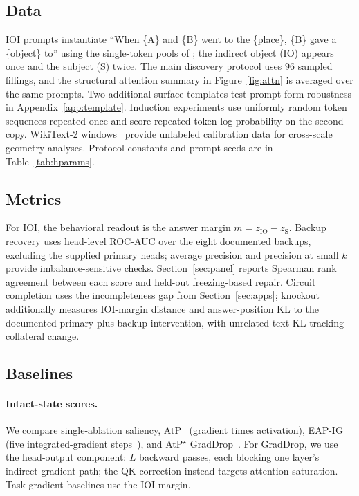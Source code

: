 \subsection{Data}
\label{app:data}

IOI prompts instantiate ``When \{A\} and \{B\} went to the \{place\}, \{B\} gave a \{object\} to'' using the single-token pools of \citet{wang2022ioi}; the indirect object (IO) appears once and the subject (S) twice.
The main discovery protocol uses $96$ sampled fillings, and the structural attention summary in Figure~\ref{fig:attn} is averaged over the same prompts.
Two additional surface templates test prompt-form robustness in Appendix~\ref{app:template}.
Induction experiments use uniformly random token sequences repeated once and score repeated-token log-probability on the second copy.
WikiText-2 windows~\citep{merity2017wikitext} provide unlabeled calibration data for cross-scale geometry analyses.
Protocol constants and prompt seeds are in Table~\ref{tab:hparams}.

\subsection{Metrics}
\label{app:metrics}

For IOI, the behavioral readout is the answer margin $m=z_{\mathrm{IO}}-z_{\mathrm{S}}$.
Backup recovery uses head-level ROC-AUC over the eight documented backups, excluding the supplied primary heads; average precision and precision at small $k$ provide imbalance-sensitive checks.
Section~\ref{sec:panel} reports Spearman rank agreement between each score and held-out freezing-based repair.
Circuit completion uses the incompleteness gap from Section~\ref{sec:apps}; knockout additionally measures IOI-margin distance and answer-position KL to the documented primary-plus-backup intervention, with unrelated-text KL tracking collateral change.

\subsection{Baselines}
\label{app:baselines}

\paragraph{Intact-state scores.}
We compare single-ablation saliency, AtP~\citep{syed2023attribution} (gradient times activation), EAP-IG~\citep{hanna2024faith} (five integrated-gradient steps~\citep{sundararajan2017integrated}), and AtP$^\star$ GradDrop~\citep{kramar2024atp}.
For GradDrop, we use the head-output component: $L$ backward passes, each blocking one layer's indirect gradient path; the QK correction instead targets attention saturation.
Task-gradient baselines use the IOI margin.

